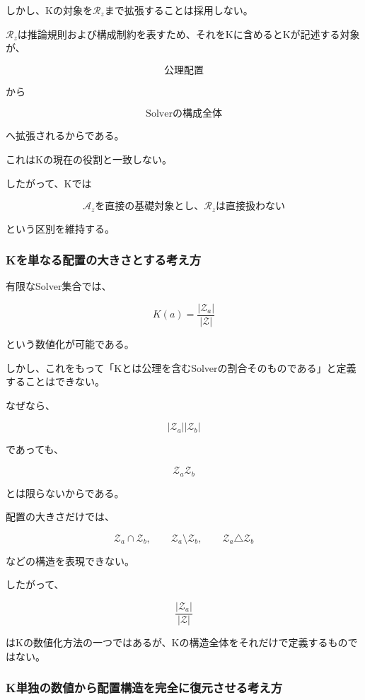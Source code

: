 しかし、Kの対象を$\mathcal{R}_z$まで拡張することは採用しない。

$\mathcal{R}_z$は推論規則および構成制約を表すため、それをKに含めるとKが記述する対象が、

\[
\text{公理配置}
\]

から

\[
\text{Solverの構成全体}
\]

へ拡張されるからである。

これはKの現在の役割と一致しない。

したがって、Kでは

\[
\boxed{
\mathcal{A}_z\text{を直接の基礎対象とし、}\mathcal{R}_z\text{は直接扱わない}
}
\]

という区別を維持する。

\subsubsection{Kを単なる配置の大きさとする考え方}

有限なSolver集合では、

\[
K(a)=\frac{|\mathcal{Z}_a|}{|\mathcal{Z}|}
\]

という数値化が可能である。

しかし、これをもって「Kとは公理を含むSolverの割合そのものである」と定義することはできない。

なぜなら、

\[
|\mathcal{Z}_a|

|\mathcal{Z}_b|
\]

であっても、

\[
\mathcal{Z}_a

\mathcal{Z}_b
\]

とは限らないからである。

配置の大きさだけでは、

\[
\mathcal{Z}_a\cap\mathcal{Z}_b,
\qquad
\mathcal{Z}_a\setminus\mathcal{Z}_b,
\qquad
\mathcal{Z}_a\triangle\mathcal{Z}_b
\]

などの構造を表現できない。

したがって、

\[
\frac{|\mathcal{Z}_a|}{|\mathcal{Z}|}
\]

はKの数値化方法の一つではあるが、Kの構造全体をそれだけで定義するものではない。

\subsubsection{K単独の数値から配置構造を完全に復元させる考え方}


